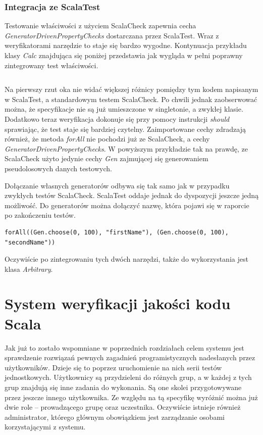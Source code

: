 \documentclass[brudnopis]{xmgr}
\begin{document}
\subsection{Integracja ze ScalaTest}

Testowanie właściwości z użyciem ScalaCheck zapewnia cecha \emph{GeneratorDrivenPropertyChecks} dostarczana przez ScalaTest. Wraz z weryfikatorami narzędzie to staje się bardzo wygodne. Kontynuacja przykładu klasy \emph{Calc} znajdująca się poniżej przedstawia jak wygląda w pełni poprawny zintegrowany test właściwości. 

\inputminted[fontsize=\small]{scala}{code/CalcTestScalaTest.scala}

Na pierwszy rzut oka nie widać większej różnicy pomiędzy tym kodem napisanym w ScalaTest, a standardowym testem ScalaCheck. Po chwili jednak zaobserwować można, że specyfikacje nie są już umieszczone w singletonie, a zwykłej klasie. Dodatkowo teraz weryfikacja dokonuje się przy pomocy instrukcji \emph{should} sprawiając, że test staje się bardziej czytelny. Zaimportowane cechy zdradzają również, że metoda \emph{forAll} nie pochodzi już ze ScalaCheck, a cechy \emph{GeneratorDrivenPropertyChecks}. W powyższym przykładzie tak na prawdę, ze ScalaCheck użyto jedynie cechy \emph{Gen} zajmującej się generowaniem pseudolosowych danych testowych.

Dołączanie własnych generatorów odbywa się tak samo jak w przypadku zwykłych testów ScalaCheck. ScalaTest oddaje jednak do dyspozycji jeszcze jedną możliwość. Do generatorów można dołączyć nazwę, która pojawi się w raporcie po zakończeniu testów.

\begin{verbatim}
forAll((Gen.choose(0, 100), "firstName"), (Gen.choose(0, 100), "secondName"))
\end{verbatim}

Oczywiście po zintegrowaniu tych dwóch narzędzi, także do wykorzystania jest klasa \emph{Arbitrary}.

\chapter{System weryfikacji jakości kodu Scala}

Jak już to zostało wspomniane w poprzednich rozdziałach celem systemu jest sprawdzenie rozwiązań pewnych zagadnień programistycznych nadesłanych przez użytkowników. Dzieje się to poprzez uruchomienie na nich serii testów jednostkowych. Użytkownicy są przydzieleni do różnych grup, a w każdej z tych grup znajdują się inne zadania do wykonania. Są one skolei przygotowywane przez jeszcze innego użytkownika. Ze względu na tą specyfikę wyróżnić można już dwie role -- prowadzącego grupę oraz uczestnika. Oczywiście istnieje również administrator, którego głównym obowiązkiem jest zarządzanie osobami korzystającymi z systemu.
\end{document}
